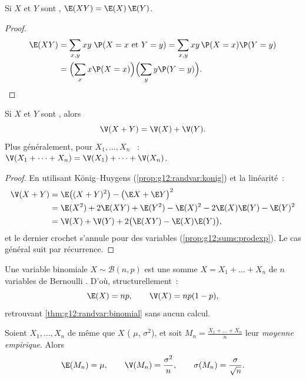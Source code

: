 \begin{proposition}\label{prop:g12:sums:prodexp}
Si $X$ et $Y$ sont , $\E(XY) = \E(X)\,\E(Y)$.
\end{proposition}

\begin{proof}
\[
\begin{aligned}
\E(XY) &= \sum_{x, y} xy\;\P(X = x \text{ et } Y = y)
= \sum_{x, y} xy\,\P(X=x)\P(Y=y) \\
&= \Bigl(\sum_x x\P(X=x)\Bigr)\Bigl(\sum_y y\P(Y=y)\Bigr). \qedhere
\end{aligned}
\]
\end{proof}

\begin{theorem}\label{thm:g12:sums:variance}
Si $X$ et $Y$ sont \emph{}, alors
\[
\V(X + Y) = \V(X) + \V(Y).
\]
Plus généralement, pour $X_1, \dots, X_n$ ~:
$\V(X_1 + \dots + X_n) = \V(X_1) + \dots + \V(X_n)$.
\end{theorem}

\begin{proof}
En utilisant König--Huygens (\cref{prop:g12:randvar:konig}) et la linéarité~:
\begin{align*}
\V(X + Y) &= \E\bigl((X+Y)^2\bigr) - \bigl(\E X + \E Y\bigr)^2\\
&= \E(X^2) + 2\E(XY) + \E(Y^2)
- \E(X)^2 - 2\E(X)\E(Y) - \E(Y)^2\\
&= \V(X) + \V(Y) + 2\bigl(\E(XY) - \E(X)\E(Y)\bigr),
\end{align*}
et le dernier crochet s'annule pour des variables 
(\cref{prop:g12:sums:prodexp}). Le cas général suit par récurrence.
\end{proof}

\begin{example}\label{ex:g12:sums:binomial}
Une variable binomiale $X \sim \mathcal B(n, p)$ est une somme
$X = X_1 + \dots + X_n$ de $n$ variables de Bernoulli . D'où,
structurellement~:
\[
\E(X) = np, \qquad \V(X) = np(1-p),
\]
retrouvant \cref{thm:g12:randvar:binomial} sans aucun calcul.
\end{example}

\begin{proposition}\label{prop:g12:sums:mean}
Soient $X_1, \dots, X_n$  de même  que $X$ (
$\mu$,  $\sigma^2$), et soit
$M_n = \frac{X_1 + \dots + X_n}{n}$ leur \emph{moyenne
empirique}. Alors
\[
\E(M_n) = \mu, \qquad \V(M_n) = \frac{\sigma^2}{n}, \qquad
\sigma(M_n) = \frac{\sigma}{\sqrt n}.
\]
\end{proposition}

